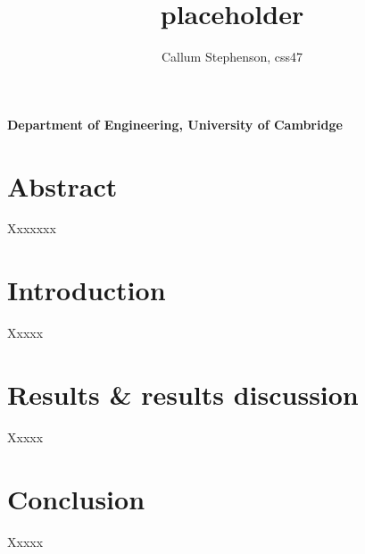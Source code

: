 \documentclass[a4,12pt]{article}
\title{\textbf{placeholder}}
\author{Callum Stephenson, css47}
\date{}
\begin{document}
    \begin{titlepage}
        \maketitle
        \thispagestyle{empty}
        \vspace{20cm}
        \textbf{Department of Engineering, University of Cambridge}
    \end{titlepage}
    \tableofcontents
    \newpage
    \section{Abstract}
    Xxxxxxx
    \section{Introduction}
    Xxxxx
    \section{Results \& results discussion}
    Xxxxx
    \section{Conclusion}
    Xxxxx
    \begin{thebibliography}{99}
        
    \end{thebibliography}
\end{document}
